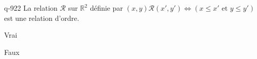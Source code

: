 \begin{truefalse}{q-922}
La relation $\mathcal R$ sur $\mathbb R^2$ définie par $(x,y) \mathcal R (x',y') \iff (x\leq x' \text{ et } y\leq y')$ est une relation d'ordre.
\item* Vrai
\item Faux
\end{truefalse}

